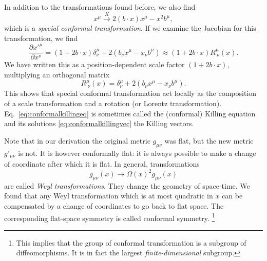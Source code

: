 \documentclass[a4paper,12pt]{article}
\numberwithin{equation}{section}
\begin{document}
In addition to the transformations found before, we also find
\begin{equation}
	x^\mu \xrightarrow{K} 2 (b \cdot x) x^\mu - x^2 b^\mu,
\end{equation}
which is a \emph{special conformal transformation}.
If we examine the Jacobian for this transformation, we find
\begin{equation}
	\frac{\partial x'^\mu}{\partial x^\nu}
	= \left(1 + 2 b \cdot x \right) \delta^\mu_\nu
	+ 2 \left( b_\nu x^\mu - x_\nu b^\mu \right)
	\approx \left(1 + 2 b \cdot x \right)
	R^\mu_{~\nu}(x).
\end{equation}
We have written this as a position-dependent scale factor $(1 + 2 b \cdot x)$, multiplying an orthogonal matrix
\begin{equation}
	R^\mu_{~\nu}(x) = \delta^\mu_\nu
	+ 2 \left( b_\nu x^\mu - x_\nu b^\mu \right).
\end{equation}
This shows that special conformal transformation act locally as the composition of a scale transformation and a rotation (or Lorentz transformation).
Eq.~\eqref{eq:conformalkillingeq} is sometimes called the (conformal) Killing equation and its solutions \eqref{eq:conformalkillingvec} the Killing vectors.



Note that in our derivation the original metric $g_{\mu\nu}$ was flat, but the new metric $g'_{\mu\nu}$ is not. It is however conformally flat: it is always possible to make a change of coordinate after which it is flat. In general, transformations
\begin{equation}
	g_{\mu\nu}(x) \to \Omega(x)^2 g_{\mu\nu}(x)
\end{equation}
are called \emph{Weyl transformations}. They change the geometry of space-time. We found that any Weyl transformation which is at most quadratic in $x$ can be compensated by a change of coordinates to go back to flat space. The corresponding flat-space symmetry is called conformal symmetry.%
%
\footnote{This implies that the group of conformal transformation is a subgroup of diffeomorphisms. It is in fact the largest \emph{finite-dimensional} subgroup.}%
\end{document}

